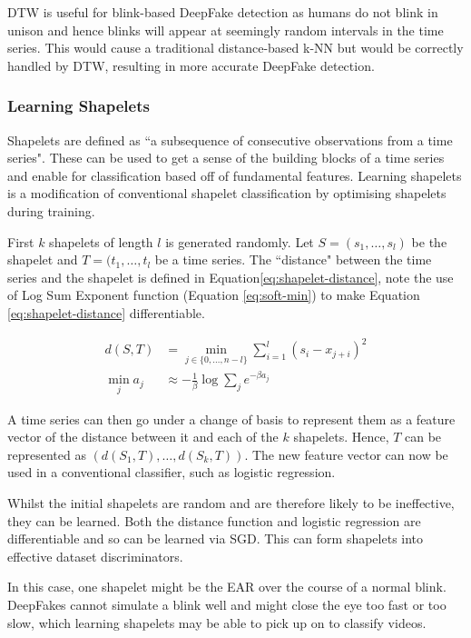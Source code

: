 DTW is useful for blink-based DeepFake detection as humans do not blink in unison and hence blinks will appear at seemingly random intervals in the time series. This would cause a traditional distance-based k-NN but would be correctly handled by DTW, resulting in more accurate DeepFake detection.

\subsubsection{Learning Shapelets}

Shapelets are defined as ``a subsequence of consecutive observations from a time series"\cite{faouzi2024time}. These can be used to get a sense of the building blocks of a time series and enable for classification based off of fundamental features. Learning shapelets\cite{grabocka2014learning} is a modification of conventional shapelet classification by optimising shapelets during training. 

First $k$ shapelets of length $l$ is generated randomly. Let $S = (s_1,\dots,s_l)$ be the shapelet and $T=(t_1,\dots,t_l$ be a time series. The ``distance" between the time series and the shapelet is defined in Equation\ref{eq:shapelet-distance}, note the use of Log Sum Exponent function (Equation \ref{eq:soft-min}) to make Equation \ref{eq:shapelet-distance} differentiable.

\begin{align}
    d(S,T) &= \min_{j \in \{0,\dots,n-l\}} \sum^l_{i=1} (s_i -x_{j+i})^2 \label{eq:shapelet-distance}\\
    \min_j a_j &\approx -\frac{1}{\beta} \log \sum_j e^{-\beta a_j} \label{eq:soft-min}
\end{align}

A time series can then go under a change of basis to represent them as a feature vector of the distance between it and each of the $k$ shapelets. Hence, $T$ can be represented as $(d(S_1,T),\dots,d(S_k,T))$. The new feature vector can now be used in a conventional classifier, such as logistic regression\cite{cramer2002origins}. 

Whilst the initial shapelets are random and are therefore likely to be ineffective, they can be learned. Both the distance function and logistic regression are differentiable and so can be learned via SGD\cite{robbins1951stochastic}. This can form shapelets into effective dataset discriminators.

In this case, one shapelet might be the EAR over the course of a normal blink. DeepFakes cannot simulate a blink well and might close the eye too fast or too slow, which learning shapelets may be able to pick up on to classify videos.

